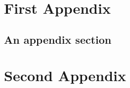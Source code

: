 \appendix

\chapter{First Appendix}
\label{chap:somelabel}

\lipsum[3-4]

\section{An appendix section}
\lipsum[5-6]

\chapter{Second Appendix}
\label{chap:someotherlabel}

\lipsum[4-5]
